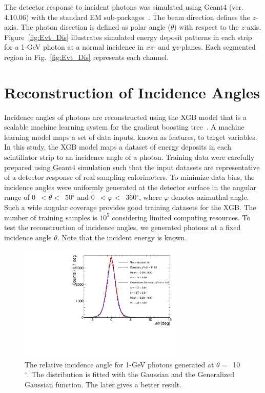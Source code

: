 \documentclass[preprint,12pt,times,a4paper]{elsarticle}
\begin{document}
The detector response to incident photons was simulated using Geant4 (ver. 4.10.06) with the standard EM sub-packages~\cite{GEANT4}. The beam direction defines the $z$-axis. The photon direction is defined as polar angle ($\theta$) with respect to the $z$-axis. Figure~\ref{fig:Evt_Dis} illustrates simulated energy deposit patterns in each strip for a 1-GeV photon at a normal incidence in $xz$- and $yz$-planes. Each segmented region in Fig.~\ref{fig:Evt_Dis} represents each channel.

\section{Reconstruction of Incidence Angles}
\label{sec:res}

Incidence angles of photons are reconstructed using the XGB model that is a scalable machine learning system for the gradient boosting tree~\cite{xgboost:2016}. A machine learning model maps a set of data inputs, known as features, to target variables. In this study, the XGB model maps a dataset of energy deposits in each scintillator strip to an incidence angle of a photon. Training data were carefully prepared using Geant4 simulation such that the input datasets are representative of a detector response of real sampling calorimeters. To minimize data bias, the incidence angles were uniformly generated at the detector surface in the angular range of 0~$<\theta<$~50$^{\circ}$ and 0~$<\varphi<$~360$^{\circ}$, where $\varphi$ denotes azimuthal angle. Such a wide angular coverage provides good training datasets for the XGB. The number of training samples is $10^{5}$ considering limited computing resources. To test the reconstruction of incidence angles, we generated photons at a fixed incidence angle $\theta$. Note that the incident energy is known.

\begin{figure}[!hbt]
\centering
\includegraphics[width=0.7\textwidth]{figures/Fig3_fit_GG.pdf}
\caption{ The relative incidence angle for 1-GeV photons generated at $\theta=$~10$^{\circ}$. The distribution is fitted with the Gaussian and the Generalized Gaussian function. The later gives a better result.}
\label{fig:angle_10degree}
\end{figure}
\end{document}
